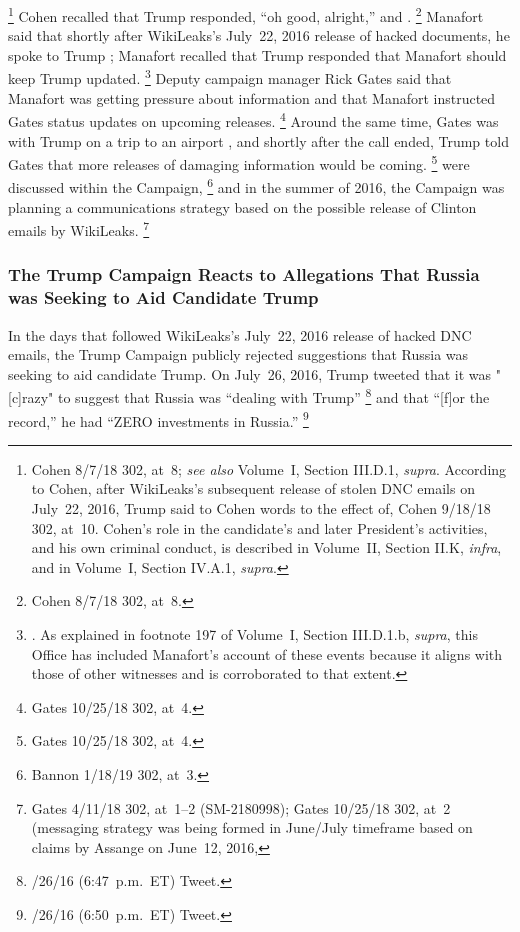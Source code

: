 \footnote{Cohen 8/7/18 302, at~8;
\textit{see also} Volume~I, Section III.D.1, \textit{supra}.
According to Cohen, after WikiLeaks's subsequent release of stolen DNC emails on July~22, 2016, Trump said to Cohen words to the effect of, 
Cohen 9/18/18 302, at~10.
Cohen's role in the candidate's and later President's activities, and his own criminal conduct, is described in Volume~II, Section II.K, \textit{infra}, and in Volume~I, Section IV.A.1, \textit{supra}.}
Cohen recalled that Trump responded, ``oh good, alright,'' and .%
\footnote{Cohen 8/7/18 302, at~8.}
Manafort said that shortly after WikiLeaks's July~22, 2016 release of hacked documents, he spoke to Trump ; Manafort recalled that Trump responded that Manafort should  keep Trump updated.%
\footnote{.
As explained in footnote 197 of Volume~I, Section III.D.1.b, \textit{supra}, this Office has included Manafort's account of these events because it aligns with those of other witnesses and is corroborated to that extent.}
Deputy campaign manager Rick Gates said that Manafort was getting pressure about  information and that Manafort instructed Gates  status updates on upcoming releases.%
\footnote{Gates 10/25/18 302, at~4.}
Around the same time, Gates was with Trump on a trip to an airport , and shortly after the call ended, Trump told Gates that more releases of damaging information would be coming.%
\footnote{Gates 10/25/18 302, at~4.}
 were discussed within the Campaign,%
\footnote{Bannon 1/18/19 302, at~3.}
and in the summer of 2016, the Campaign was planning a communications strategy based on the possible release of Clinton emails by WikiLeaks.%
\footnote{Gates 4/11/18 302, at~1--2 (SM-2180998);
Gates 10/25/18 302, at~2 (messaging strategy was being formed in June/July timeframe based on claims by Assange on June~12, 2016, }

\subsubsection{The Trump Campaign Reacts to Allegations That Russia was Seeking to Aid Candidate Trump}
In the days that followed WikiLeaks's July~22, 2016 release of hacked DNC emails, the Trump Campaign publicly rejected suggestions that Russia was seeking to aid candidate Trump.
On July~26, 2016, Trump tweeted that it was "[c]razy" to suggest that Russia was ``dealing with Trump''%
\footnote{/26/16 (6:47~p.m.~ET) Tweet.}
and that ``[f]or the record,'' he had ``ZERO investments in Russia.''%
\footnote{/26/16 (6:50~p.m.~ET) Tweet.}

